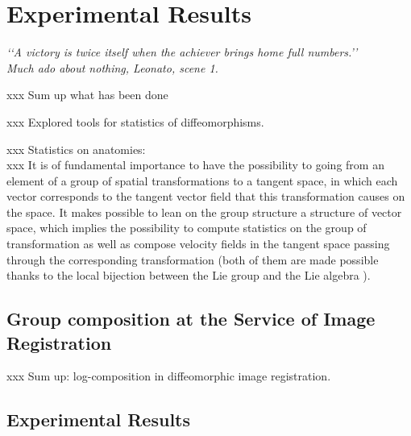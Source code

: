 \chapter{Experimental Results}\label{ch:results}

\begin{flushright}
	\emph{\lq\lq A victory is twice itself when the achiever brings home full numbers.\rq\rq \\
		       \emph{Much ado about nothing}, Leonato, scene 1.}
\end{flushright}

xxx Sum up what has been done

xxx Explored tools for statistics of diffeomorphisms.



xxx Statistics on anatomies: \\
xxx It is of fundamental importance to have the possibility to going from an element of a group of spatial transformations  to a tangent space, in which each vector corresponds to the tangent vector field that this transformation causes on the space. It makes possible to lean on the group structure a structure of vector space, which implies the possibility to compute statistics on the group of transformation as well as compose velocity fields in the tangent space passing through the corresponding transformation (both of them are made possible thanks to the local bijection between the Lie group and the Lie algebra ). \\

\section{Group composition at the Service of Image Registration}

xxx Sum up: log-composition in diffeomorphic image registration.\\




\section{Experimental Results}

